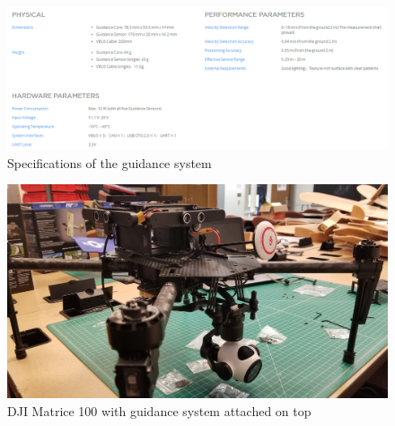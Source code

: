 \begin{figure}
\begin{center}
\includegraphics[width=\columnwidth]{figures/hovering1.png}
\end{center}
\caption{Specifications of the guidance system}
\label{fig:hovering1}
\end{figure}

\begin{figure}
\begin{center}
\includegraphics[width=\columnwidth]{figures/hovering2.png}
\end{center}
\caption{DJI Matrice 100 with guidance system attached on top}
\label{fig:hovering2}
\end{figure}

